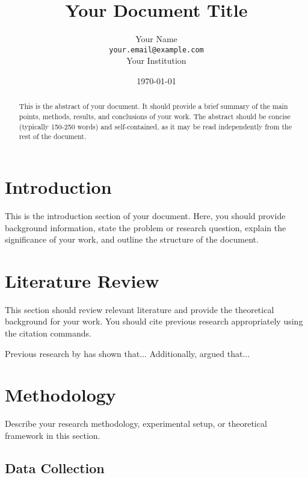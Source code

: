 \documentclass[12pt,a4paper,twoside]{article}
\title{\textbf{Your Document Title}}
\author{
    Your Name\\
    \texttt{your.email@example.com}\\
    Your Institution
}
\date{\today}
\begin{document}
\maketitle
\thispagestyle{empty}

\begin{abstract}
    \noindent This is the abstract of your document. It should provide a brief summary of the main points, methods, results, and conclusions of your work. The abstract should be concise (typically 150-250 words) and self-contained, as it may be read independently from the rest of the document.
\end{abstract}

\newpage
\tableofcontents
\newpage

\section{Introduction}
\label{sec:introduction}

This is the introduction section of your document. Here, you should provide background information, state the problem or research question, explain the significance of your work, and outline the structure of the document.

\lipsum[1-2] %

\section{Literature Review}
\label{sec:literature}

This section should review relevant literature and provide the theoretical background for your work. You should cite previous research appropriately using the citation commands.

Previous research by \textcite{Smith2020} has shown that... Additionally, \textcite{Johnson2019} argued that...

\lipsum[3] %

\section{Methodology}
\label{sec:methodology}

Describe your research methodology, experimental setup, or theoretical framework in this section.

\subsection{Data Collection}
\label{subsec:data_collection}
\end{document}
